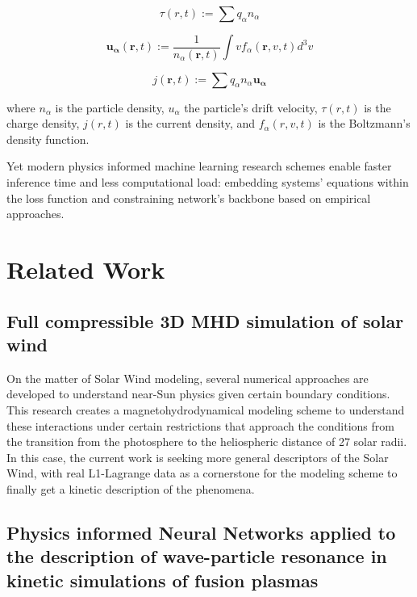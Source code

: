 \documentclass[12pt]{article}
\begin{document}
\begin{equation}
    \tau(r, t) := \sum q_{\alpha} n_{\alpha}
\end{equation}

\begin{equation}
    \mathbf{u_{\alpha}} (\mathbf{r}, t) := \frac{1}{n_{\alpha}(\mathbf{r}, t)} \int v f_{\alpha}(\mathbf{r}, v, t) d^3v
\end{equation}

\begin{equation}
    j(\mathbf{r}, t) := \sum q_{\alpha} n_{\alpha} \mathbf{u_{\alpha}}
\end{equation}

where $n_{\alpha}$ is the particle density, $u_{\alpha}$ the particle's drift velocity, $\tau(r, t)$ is the charge density, $j(r, t)$ is the current density, and $f_{\alpha}(r, v, t)$ is the Boltzmann's density function.

Yet modern physics informed machine learning research schemes enable faster inference time and less computational load: embedding systems' equations within the loss function and constraining network's backbone based on empirical approaches.

\section{Related Work}

\subsection{Full compressible 3D MHD simulation of solar wind}
On the matter of Solar Wind modeling, several numerical approaches are developed to understand near-Sun physics given certain boundary conditions. This research \cite{windmodelling1} creates a magnetohydrodynamical modeling scheme to understand these interactions under certain restrictions that approach the conditions from the transition from the photosphere to the heliospheric distance of 27 solar radii. In this case, the current work is seeking more general descriptors of the Solar Wind, with real L1-Lagrange data as a cornerstone for the modeling scheme to finally get a kinetic description of the phenomena.

\subsection{Physics informed Neural Networks applied to the description of wave-particle resonance in kinetic simulations of fusion plasmas}
\end{document}
